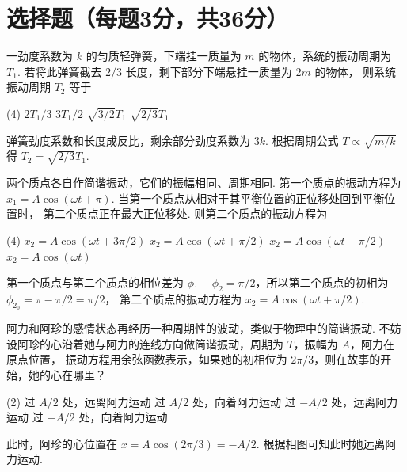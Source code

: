 \section{选择题（每题3分，共36分）}

\begin{problem}
  一劲度系数为 $k$ 的匀质轻弹簧，下端挂一质量为 $m$ 的物体，系统的振动周期为 $T_1$.
  若将此弹簧截去 $2/3$ 长度，剩下部分下端悬挂一质量为 $2m$ 的物体，
  则系统振动周期 $T_2$ 等于
  \begin{tasks}(4)
    \task $2T_1/3$
    \task $3T_1/2$
    \task $\sqrt{3/2}T_1$
    \task[\true] $\sqrt{2/3}T_1$
  \end{tasks}
\end{problem}
\scratch[1ex]
\begin{solution}
  弹簧劲度系数和长度成反比，剩余部分劲度系数为 $3k$.
  根据周期公式 $T \propto \sqrt{m/k}$ 得 $T_2 = \sqrt{2/3}T_1$.
\end{solution}

\begin{problem}
  两个质点各自作简谐振动，它们的振幅相同、周期相同.
  第一个质点的振动方程为 $x_1 = A\cos(\omega t + \pi)$.
  当第一个质点从相对于其平衡位置的正位移处回到平衡位置时，
  第二个质点正在最大正位移处. 则第二个质点的振动方程为
  \begin{tasks}(4)
    \task $x_2 = A\cos(\omega t + 3\pi/2)$
    \task[\true] $x_2 = A\cos(\omega t + \pi/2)$
    \task $x_2 = A\cos(\omega t - \pi/2)$
    \task $x_2 = A\cos(\omega t)$
  \end{tasks}
\end{problem}
\scratch[1ex]
\begin{solution}
  第一个质点与第二个质点的相位差为 $\phi_1 - \phi_2 = \pi/2$，所以第二个质点的初相为 $\phi_{2_0} = \pi - \pi/2 = \pi/2$，
  第二个质点的振动方程为 $x_2 = A\cos(\omega t + \pi/2)$.
\end{solution}

\begin{problem}
  阿力和阿珍的感情状态再经历一种周期性的波动，类似于物理中的简谐振动.
  不妨设阿珍的心沿着她与阿力的连线方向做简谐振动，周期为 $T$，振幅为 $A$，阿力在原点位置，
  振动方程用余弦函数表示，如果她的初相位为 $2\pi/3$，则在故事的开始，她的心在哪里？
  \begin{tasks}(2)
    \task 过 $A/2$ 处，远离阿力运动
    \task 过 $A/2$ 处，向着阿力运动
    \task[\true] 过 $-A/2$ 处，远离阿力运动
    \task 过 $-A/2$ 处，向着阿力运动
  \end{tasks}
\end{problem}
\scratch[1ex]
\begin{solution}
  此时，阿珍的心位置在 $x = A\cos(2\pi/3) = -A/2$. 根据相图可知此时她远离阿力运动.
\end{solution}


